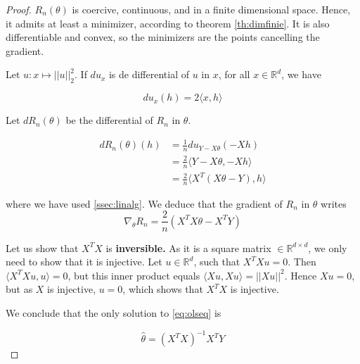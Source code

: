 \documentclass[
10pt, %
a4paper, %
oneside, %
headinclude,footinclude, %
BCOR5mm, %
]{scrartcl}
\begin{document}
\begin{proof}

    $R_n(\theta)$ is coercive, continuous, and in a finite dimensional space. Hence, it admits at least a minimizer, according to theorem \ref{th:dimfinie}.  It is also differentiable and convex, so the minimizers are the points cancelling the gradient.

    Let $u:x\mapsto ||u||_2^2$. If $du_x$ is de differential of $u$ in $x$, for all $x\in \mathbb{R}^d$, we have

    \begin{equation*}
	du_x(h) = 2\langle x,h\rangle
    \end{equation*}

    Let $dR_n(\theta)$ be the differential of $R_n$ in $\theta$.

    \begin{equation*}
	\begin{aligned}
	    dR_n(\theta)(h) &= \frac{1}{n} du_{Y-X\theta}(-Xh)\\
	    &= \frac{2}{n} \langle Y-X\theta, -Xh \rangle\\
	    &= \frac{2}{n} \langle X^T(X\theta-Y), h \rangle
	\end{aligned}
    \end{equation*}

    where we have used \ref{ssec:linalg}. We deduce that the gradient of $R_n$ in $\theta$ writes
    \begin{equation}
	\label{eq:olseq}
        \nabla_{\theta} R_n = \frac{2}{n} (X^TX\theta-X^TY)
    \end{equation}

    Let us show that $X^TX$ is \textbf{{inversible.}} As it is a square matrix $\in \mathbb{R}^{d\times d}$, we only need to show that it is injective. Let $u\in \mathbb{R}^d$, such that $X^TXu = 0$. Then $ \langle X^TXu, u \rangle=0$, but this inner product equals $\langle Xu, Xu \rangle = ||Xu||^2$. Hence $Xu=0$, but as $X$ is injective, $u=0$, which shows that $X^TX$ is injective.

    We conclude that the only solution to \ref{eq:olseq} is 

    \begin{equation*}
	\hat{\theta} = (X^TX)^{-1}X^TY
    \end{equation*}



\end{proof}
\end{document}
